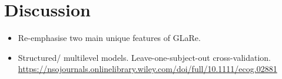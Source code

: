 \section{Discussion}\label{sec:discussion}

\begin{itemize}
    \item Re-emphasise two main unique features of GLaRe.
    \item Structured/ multilevel models. Leave-one-subject-out cross-validation. \url{https://nsojournals.onlinelibrary.wiley.com/doi/full/10.1111/ecog.02881}
\end{itemize}